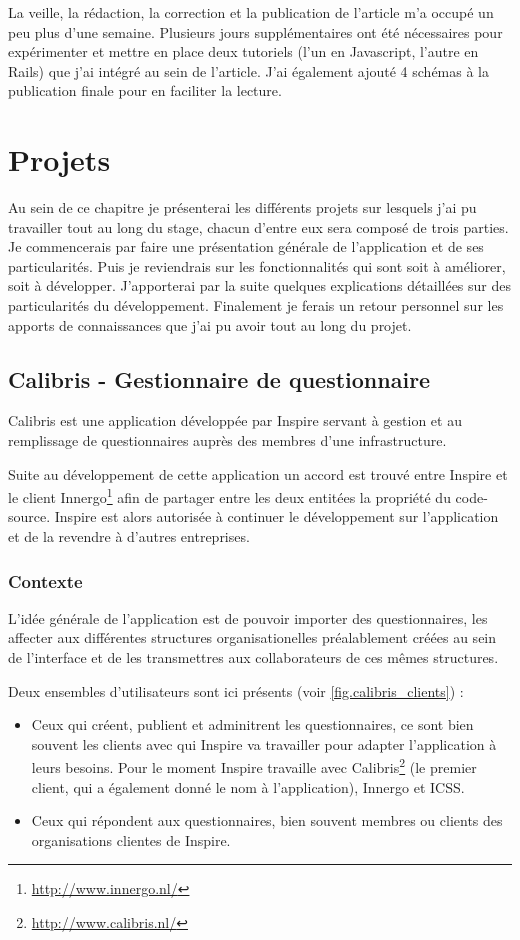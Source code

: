 \documentclass[12pt,a4paper]{book}
\begin{document}
La veille, la rédaction, la correction et la publication de l'article m'a occupé un peu plus d'une semaine. Plusieurs jours supplémentaires ont été nécessaires pour expérimenter et mettre en place deux tutoriels (l'un en Javascript, l'autre en Rails) que j'ai intégré au sein de l'article. J'ai également ajouté 4 schémas à la publication finale pour en faciliter la lecture.

\chapter{Projets}

Au sein de ce chapitre je présenterai les différents projets sur lesquels j'ai pu travailler tout au long du stage, chacun d'entre eux sera composé de trois parties. Je commencerais par faire une présentation générale de l'application et de ses particularités. Puis je reviendrais sur les fonctionnalités qui sont soit à améliorer, soit à développer. J'apporterai par la suite quelques explications détaillées sur des particularités du développement. Finalement je ferais un retour personnel sur les apports de connaissances que j'ai pu avoir tout au long du projet.

\section{Calibris - Gestionnaire de questionnaire}

\label{sec:calibris}
Calibris est une application développée par Inspire servant à gestion et au remplissage de questionnaires auprès des membres d'une infrastructure.

Suite au développement de cette application un accord est trouvé entre Inspire et le client Innergo\footnote{\url{http://www.innergo.nl/}} afin de partager entre les deux entitées la propriété du code-source. Inspire est alors autorisée à continuer le développement sur l'application et de la revendre à d'autres entreprises.

\subsection{Contexte}

L'idée générale de l'application est de pouvoir importer des questionnaires, les affecter aux différentes structures organisationelles préalablement créées au sein de l'interface et de les transmettres aux collaborateurs de ces mêmes structures. 

Deux ensembles d'utilisateurs sont ici présents (voir \cref{fig.calibris_clients}) :
\begin{itemize}
  \item Ceux qui créent, publient et adminitrent les questionnaires, ce sont bien souvent les clients avec qui Inspire va travailler pour adapter l'application à leurs besoins. Pour le moment Inspire travaille avec Calibris\footnote{\url{http://www.calibris.nl/}} (le premier client, qui a également donné le nom à l'application), Innergo et ICSS.
  \item Ceux qui répondent aux questionnaires, bien souvent membres ou clients des organisations clientes de Inspire. 
\end{itemize}
\end{document}
